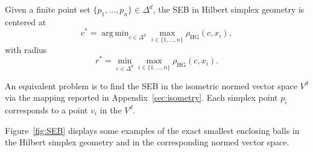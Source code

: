 \documentclass[graybox]{svmult}
\DeclareMathOperator*{\argmin}{arg\,min}
\def\st{\ :\ }
\def\HG{\mathrm{HG}}
\begin{document}
Given a finite point set $\{p_1,\ldots, p_n\}\in\Delta^d$, the SEB in Hilbert simplex geometry
is centered at
\begin{equation*}
c^*=\argmin_{c\in \Delta^d} \max_{i\in\{1,\ldots,n\}} \rho_\HG(c,x_i),
\end{equation*}
with radius
\begin{equation*}
r^*=\min_{c\in \Delta^d} \max_{i\in\{1,\ldots,n\}} \rho_\HG(c,x_i).
\end{equation*}

An equivalent problem is to find the SEB in the isometric normed vector space $V^d$
via the mapping reported in Appendix~\ref{sec:isometry}.
Each simplex point $p_i$ corresponds to a point $v_i$ in the $V^d$.

%
%


Figure~\ref{fig:SEB} displays some examples of the exact smallest enclosing balls in the Hilbert simplex geometry and in the corresponding normed vector space.
\end{document}
